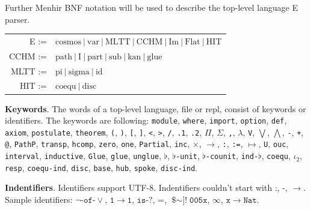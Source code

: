 \documentclass[a4paper,UKenglish,cleveref, autoref, thm-restate]{lipics-v2021}
\begin{document}
Further Menhir BNF notation will be used to describe the top-level language E parser.

\begin{table}[ht!]
\centering
\begin{tabular}{rl}
      E :=&$\textrm{cosmos}\ |\ \textrm{var}\ |\ \textrm{MLTT}\ |\ \textrm{CCHM}\ |\ \textrm{Im}\ |\ \textrm{Flat}\ |\ \textrm{HIT}$ \\
   CCHM :=&$\textrm{path}\ |\ \textrm{I}\ |\ \textrm{part}\ |\ \textrm{sub}\ |\ \textrm{kan}\ |\ \textrm{glue}$ \\
   MLTT :=&$\textrm{pi}\ |\ \textrm{sigma}\ |\ \textrm{id}$ \\
    HIT :=&$\textrm{coequ}\ |\ \textrm{disc}$ \\
\end{tabular}
\end{table}

\textbf{Keywords}. The words of a top-level language, file or repl, consist of keywords or identifiers.
The keywords are following: \texttt{module}, \texttt{where}, \texttt{import}, \texttt{option}, \texttt{def}, \texttt{axiom},
\texttt{postulate}, \texttt{theorem}, \texttt{(}, \texttt{)}, \texttt{[}, \texttt{]}, \texttt{<}, \texttt{>},
\texttt{/}, \texttt{.1}, \texttt{.2}, \texttt{$\Pi$}, \texttt{$\Sigma$}, \texttt{,}, \texttt{$\lambda$},
\texttt{V}, \texttt{$\bigvee$}, \texttt{$\bigwedge$}, \texttt{-}, \texttt{+}, \texttt{@}, \texttt{PathP},
\texttt{transp}, \texttt{hcomp}, \texttt{zero}, \texttt{one}, \texttt{Partial}, \texttt{inc},
\texttt{$\times$}, \texttt{$\rightarrow$}, \texttt{:}, \texttt{:=}, \texttt{$\mapsto$}, \texttt{U},
\texttt{ouc}, \texttt{interval}, \texttt{inductive}, \texttt{Glue}, \texttt{glue}, \texttt{unglue},
\texttt{$\flat$}, \texttt{$\flat$-unit}, \texttt{$\flat$-counit}, \texttt{ind-$\flat$}, \texttt{coequ}, \texttt{$\iota_2$}, \texttt{resp}, \texttt{coequ-ind}, \texttt{disc}, \texttt{base}, \texttt{hub}, \texttt{spoke}, \texttt{disc-ind}.

\textbf{Indentifiers}. Identifiers support UTF-8. Indentifiers couldn't
start with $\texttt{:}$, $\texttt{-}$, $\rightarrow$. Sample identifiers:
$\neg\texttt{-of-}\vee$, $\texttt{1}$$\rightarrow$$\texttt{1}$, $\texttt{is-?}$,
$\texttt{=}$, $\texttt{\$$\sim$]!}$$\texttt{005x}$, $\infty$, $\texttt{x}$$\rightarrow$$\texttt{Nat}$.
\end{document}
